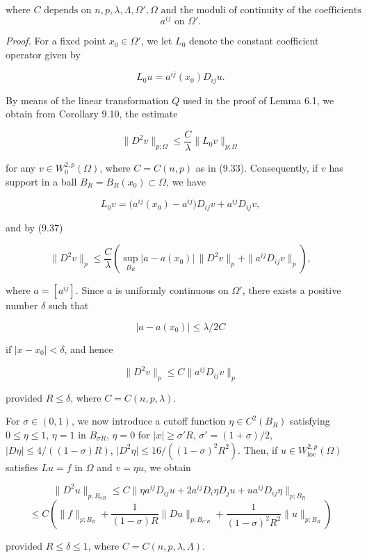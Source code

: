 
\[
\text{where } C \text{ depends on } n, p, \lambda, \Lambda, \Omega', \Omega \text{ and the moduli of continuity of the coefficients}
\]
\[
a^{ij} \text{ on } \Omega'.
\]

\textit{Proof.} For a fixed point $x_0 \in \Omega'$, we let $L_0$ denote the constant coefficient operator
given by

\[
L_0 u = a^{ij}(x_0)D_{ij}u.
\]

By means of the linear transformation $Q$ used in the proof of Lemma 6.1, we obtain
from Corollary 9.10, the estimate

\[
\tag{9.37}
\|D^2 v\|_{p;\Omega} \le \frac{C}{\lambda}\|L_0 v\|_{p;\Omega}
\]

for any $v \in W^{2,p}_0(\Omega)$, where $C = C(n,p)$ as in (9.33). Consequently, if $v$ has support
in a ball $B_R = B_R(x_0) \subset \Omega$, we have

\[
L_0v = \bigl(a^{ij}(x_0)-a^{ij}\bigr)D_{ij}v + a^{ij}D_{ij}v,
\]

and by (9.37)

\[
\|D^2 v\|_p \le \frac{C}{\lambda}\left(\sup_{B_R}\lvert a-a(x_0)\rvert \,\|D^2 v\|_p + \|a^{ij}D_{ij}v\|_p\right),
\]

where $a = [a^{ij}]$. Since $a$ is uniformly continuous on $\Omega'$, there exists a positive
number $\delta$ such that

\[
\lvert a-a(x_0)\rvert \le \lambda/2C
\]

if $\lvert x-x_0\rvert < \delta$, and hence

\[
\|D^2 v\|_p \le C\|a^{ij}D_{ij}v\|_p
\]

provided $R \le \delta$, where $C = C(n,p,\lambda)$.

For $\sigma \in (0,1)$, we now introduce a cutoff function $\eta \in C^2(B_R)$ satisfying $0 \le
\eta \le 1$, $\eta = 1$ in $B_{\sigma R}$, $\eta = 0$ for $\lvert x\rvert \ge \sigma'R$, $\sigma' = (1+\sigma)/2$, $\lvert D\eta\rvert \le 4/((1-\sigma)R)$,
$\lvert D^2\eta\rvert \le 16/((1-\sigma)^2R^2)$. Then, if $u \in W^{2,p}_{\mathrm{loc}}(\Omega)$ satisfies $Lu = f$ in $\Omega$ and $v = \eta u$, we
obtain

\[
\|D^2 u\|_{p;B_{\sigma R}} \le C\|\eta a^{ij}D_{ij}u + 2a^{ij}D_i\eta D_j u + ua^{ij}D_{ij}\eta\|_{p;B_R}
\]
\[
\le C\left(\|f\|_{p;B_R} + \frac{1}{(1-\sigma)R}\|Du\|_{p;B_{\sigma'R}}
+ \frac{1}{(1-\sigma)^2R^2}\|u\|_{p;B_R}\right)
\]

provided $R \le \delta \le 1$, where $C = C(n,p,\lambda,\Lambda)$.

